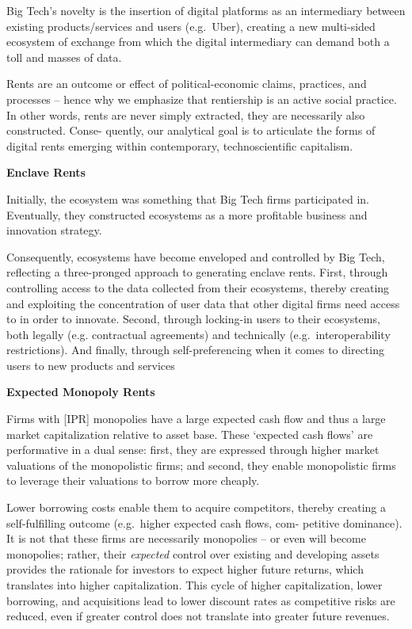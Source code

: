 \documentclass[
]{book}
\begin{document}
Big Tech's novelty is the insertion of
digital platforms as an intermediary between existing products/services
and users (e.g.~Uber), creating a new multi-sided ecosystem of exchange
from which the digital intermediary can demand both a toll and masses of
data.

Rents are an
outcome or effect of political-economic claims, practices, and processes -- hence
why we emphasize that rentiership is an active social practice. In other words,
rents are never simply extracted, they are necessarily also constructed. Conse-
quently, our analytical goal is to articulate the forms of digital rents emerging
within contemporary, technoscientific capitalism.

\textbf{Enclave Rents}

Initially, the ecosystem was something that Big Tech firms participated in.
Eventually, they constructed ecosystems as a more profitable business and
innovation strategy.

Consequently, ecosystems have become enveloped and
controlled by Big Tech, reflecting a three-pronged approach to generating
enclave rents. First, through controlling access to the data collected from
their ecosystems, thereby creating and exploiting the concentration of user
data that other digital firms need access to in order to innovate.
Second, through locking-in users to their ecosystems, both legally (e.g.
contractual agreements) and technically (e.g.~interoperability restrictions).
And finally, through self-preferencing when it comes to
directing users to new products and services

\textbf{Expected Monopoly Rents}

Firms with {[}IPR{]} monopolies have a large expected cash flow and thus a
large market capitalization relative to asset base.
These
`expected cash flows' are performative in a dual sense: first, they are expressed
through higher market valuations of the monopolistic firms; and second, they
enable monopolistic firms to leverage their valuations to borrow more cheaply.

Lower borrowing costs enable them to acquire competitors,
thereby creating a self-fulfilling outcome (e.g.~higher expected cash flows, com-
petitive dominance). It is not that these firms are necessarily monopolies -- or
even will become monopolies; rather, their \emph{expected} control over existing and
developing assets provides the rationale for investors to expect higher future
returns, which translates into higher capitalization.
This cycle of higher capitalization, lower borrowing, and acquisitions
lead to lower discount rates as competitive risks are reduced, even if greater
control does not translate into greater future revenues.
\end{document}
